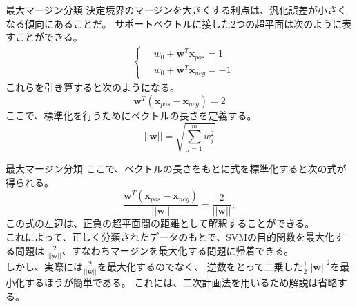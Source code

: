 \documentclass[aspectratio=169, dvipdfmx, 11pt]{beamer} %
\begin{document}
\begin{frame}{最大マージン分類}
    決定境界のマージンを大きくする利点は、汎化誤差が小さくなる傾向にあることだ。
    サポートベクトルに接した2つの超平面は次のように表すことができる。
    \begin{equation*}
        \begin{aligned}
            & \left\{ \,
                \begin{aligned}
                    & w_0 + \textbf{w}^T \textbf{x}_{pos} = 1 \\
                    & w_0 + \textbf{w}^T \textbf{x}_{neg} = -1
                \end{aligned}
            \right.
        \end{aligned}
    \end{equation*}
    これらを引き算すると次のようになる。
    \begin{equation*}
        \textbf{w}^T (\textbf{x}_{pos} - \textbf{x}_{neg}) = 2
    \end{equation*}
    ここで、標準化を行うためにベクトルの長さを定義する。
    \begin{equation*}
        ||\textbf{w}|| = \sqrt{{\textstyle \sum_{j=1}^{m} w_{j}^{2}}}
    \end{equation*}
\end{frame}

\begin{frame}{最大マージン分類}
    ここで、ベクトルの長さをもとに式を標準化すると次の式が得られる。
    \begin{equation*}
        \frac{\textbf{w}^T (\textbf{x}_{pos} - \textbf{x}_{neg})}{||\textbf{w}||} = \frac{2}{||\textbf{w}||}, 
    \end{equation*}
    この式の左辺は、正負の超平面間の距離として解釈することができる。\\
    これによって、正しく分類されたデータのもとで、SVMの目的関数を最大化する問題は
    \(\frac{2}{||\textbf{w}||}\)、すなわちマージンを最大化する問題に帰着できる。\\
    しかし、実際には\(\frac{2}{||\textbf{w}||}\)を最大化するのでなく、
    逆数をとって二乗した\(\frac{1}{2}||\textbf{w}||^2\)を最小化するほうが簡単である。
    これには、二次計画法を用いるため解説は省略する。
\end{frame}
\end{document}
